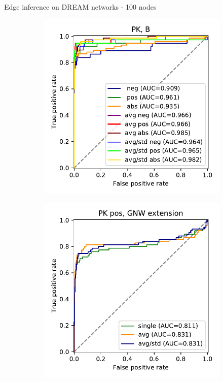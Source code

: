 \begin{frame}{Edge inference on DREAM networks - 100 nodes}
\begin{figure}[ht]
\begin{subfigure}[b]{0.24\textwidth}
\includegraphics[width=\textwidth]{analysis/fig/roc_pk_prim_B.pdf}
\end{subfigure}
\hfill
\begin{subfigure}[b]{0.24\textwidth}\centering\caption{}
\includegraphics[width=\textwidth]{analysis/fig/roc_pk_gnw_pos.pdf}\label{fig:micro_average.c}

\end{subfigure}
\end{figure}
\end{frame}
